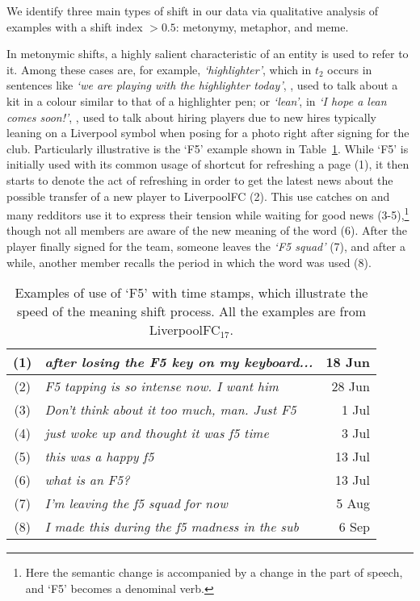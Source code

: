 We identify three main types of shift in our data via qualitative analysis of examples with a shift index $> 0.5$: metonymy, metaphor, and meme.  

In metonymic shifts, a highly salient characteristic of an entity is used to refer to it. Among these cases are, for example, {\em `highlighter'}, which in $t_2$ occurs in sentences like \textit{`we are playing with the highlighter today'},
, 
used to talk about a kit in a colour similar to that of a highlighter pen; or {\em `lean'}, in \textit{`I hope a lean comes soon!'},
, 
used to talk about hiring players due to new hires typically leaning on a Liverpool symbol when posing for a photo right after signing for the club. Particularly illustrative is the `F5' example shown in
Table~\ref{table:f5}. While `F5' is initially used with its common usage of shortcut for refreshing a page (1), it then starts to denote the act of refreshing in order to get the latest news about the possible transfer of a new player to LiverpoolFC (2). This use catches on and many redditors use it to express their tension while waiting for good news (3-5),\footnote{Here the semantic change is accompanied by a change in the part of speech, and `F5' becomes a denominal verb.}
though not all members are aware of the new meaning of the word (6). After the player finally signed for the team, someone leaves the {\em `F5 squad'} (7), and after a while, another member recalls the period in which the word was used (8).


\begin{table}[t]\centering   \small
    \begin{tabular}{@{}cp{5.5cm}r@{}}
        \hline
        (1) & \em after losing the F5 key on my keyboard... & 18 Jun\\\hline
        (2) & \em F5 tapping is so intense now. I want him & 28 Jun\\\hline
        (3) & \em Don't think about it too much, man. Just F5 & 1 Jul\\\hline
        (4) & \em just woke up and thought it was f5 time & 3 Jul\\\hline
        (5) & \em this was a happy f5 & 13 Jul\\\hline
        (6) & \em what is an F5? & 13 Jul \\\hline
        (7) & \em I'm leaving the f5 squad for now & 5 Aug\\\hline
        (8) & \em I made this during the f5 madness in the sub & 6 Sep\\\hline      
    \end{tabular}
    \caption{Examples of use of `F5' with time stamps, which illustrate the speed of the meaning shift process. All the examples are from LiverpoolFC$_{17}$.}
     \label{table:f5}
\end{table}


